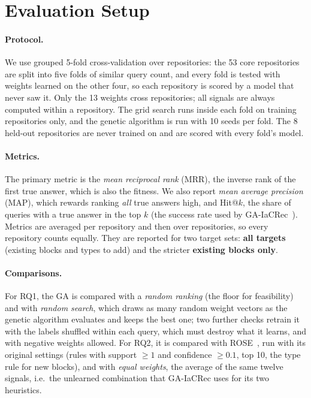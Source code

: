\section{Evaluation Setup}
\label{sec:evaluation}

\paragraph{Protocol.} We use grouped 5-fold cross-validation over repositories: the 53 core
repositories are split into five folds of similar query count, and every fold is tested with
weights learned on the other four, so each repository is scored by a model that never saw it. Only
the 13 weights cross repositories; all signals are always computed within a repository. The grid
search runs inside each fold on training repositories only, and the genetic algorithm is run with
10 seeds per fold. The 8 held-out repositories are never trained on and are scored with every
fold's model.

\paragraph{Metrics.} The primary metric is the \emph{mean reciprocal rank} (MRR), the inverse rank of
the first true answer, which is also the fitness. We also report \emph{mean average precision} (MAP),
which rewards ranking \emph{all} true answers high, and Hit@$k$, the share of queries with a true
answer in the top $k$ (the success rate used by GA-IaCRec~\cite{bessghaier2026iacrec}). Metrics
are averaged per repository and then over repositories, so every repository counts equally. They
are reported for two target sets: \textbf{all targets} (existing blocks and types to add) and the
stricter \textbf{existing blocks only}.

\paragraph{Comparisons.} For RQ1, the GA is compared with a \emph{random ranking} (the
floor for feasibility) and with \emph{random search}, which draws as many random weight vectors as
the genetic algorithm evaluates and keeps the best one; two further checks retrain it with the
labels shuffled within each query, which must destroy what it learns, and with negative weights
allowed. For RQ2, it is compared with ROSE~\cite{zimmermann2004rose}, run with its original
settings (rules with support $\ge 1$ and confidence $\ge 0.1$, top 10, the type rule for new
blocks), and with \emph{equal weights}, the average of the same twelve signals, i.e.\ the
unlearned combination that GA-IaCRec uses for its two heuristics.

